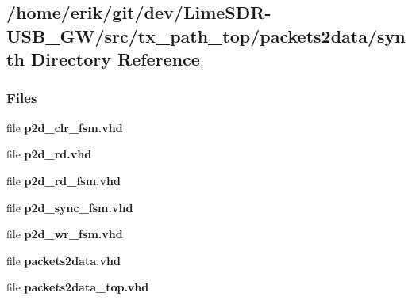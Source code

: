 \subsection{/home/erik/git/dev/\+Lime\+S\+D\+R-\/\+U\+S\+B\+\_\+\+G\+W/src/tx\+\_\+path\+\_\+top/packets2data/synth Directory Reference}
\label{dir_fcb531ffb56cc25f96deddb943cf006c}
\subsubsection*{Files}
\begin{DoxyCompactItemize}
\item 
file {\bf p2d\+\_\+clr\+\_\+fsm.\+vhd}
\item 
file {\bf p2d\+\_\+rd.\+vhd}
\item 
file {\bf p2d\+\_\+rd\+\_\+fsm.\+vhd}
\item 
file {\bf p2d\+\_\+sync\+\_\+fsm.\+vhd}
\item 
file {\bf p2d\+\_\+wr\+\_\+fsm.\+vhd}
\item 
file {\bf packets2data.\+vhd}
\item 
file {\bf packets2data\+\_\+top.\+vhd}
\end{DoxyCompactItemize}
